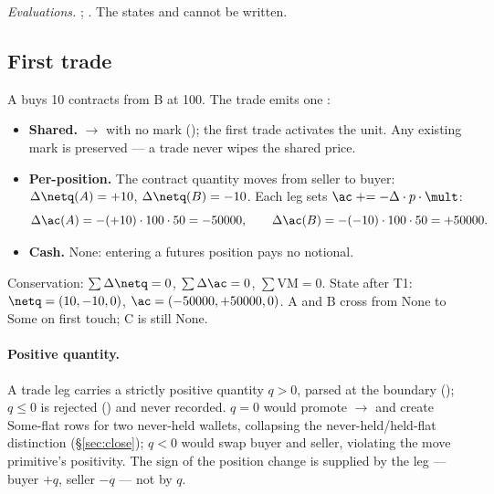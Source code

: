 \documentclass[11pt,a4paper]{article}
\begin{document}
{\raggedright\noindent\emph{Evaluations.}
;
. The states  and
 cannot be written.\par}

\subsection{First trade}
\label{sec:trade}

A buys 10 contracts from B at 100. The trade emits one :

\begin{itemize}
\item \textbf{Shared.}  $\to$  with no mark (); the
first trade activates the unit. Any existing mark is preserved --- a trade never wipes the shared price.
\item \textbf{Per-position.} The contract quantity moves from seller to buyer:
$\Delta\netq(A)=+10$, $\Delta\netq(B)=-10$. Each leg sets $\ac\mathrel{+}=-\Delta\cdot p\cdot\mult$:
\[
\Delta\ac(A) = -(+10)\cdot 100\cdot 50 = -50000,\qquad
\Delta\ac(B) = -(-10)\cdot 100\cdot 50 = +50000.
\]
\item \textbf{Cash.} None: entering a futures position pays no notional.
\end{itemize}

\noindent Conservation: $\sum\Delta\netq = 0$, $\sum\Delta\ac = 0$, $\sum\mathrm{VM}=0$. State after
T1: $\netq=(10,-10,0)$, $\ac=(-50000,+50000,0)$. A and B cross from $\mathrm{None}$ to $\mathrm{Some}$
on first touch; C is still $\mathrm{None}$.

\paragraph{Positive quantity.} A trade leg carries a strictly positive quantity $q>0$, parsed at the
boundary (); $q\le 0$ is rejected () and never recorded. $q=0$
would promote $\to$ and create $\mathrm{Some}$-flat rows for two
never-held wallets, collapsing the never-held/held-flat distinction (\S\ref{sec:close}); $q<0$ would
swap buyer and seller, violating the move primitive's positivity. The sign of the position change is
supplied by the leg --- buyer $+q$, seller $-q$ --- not by $q$.
\end{document}
